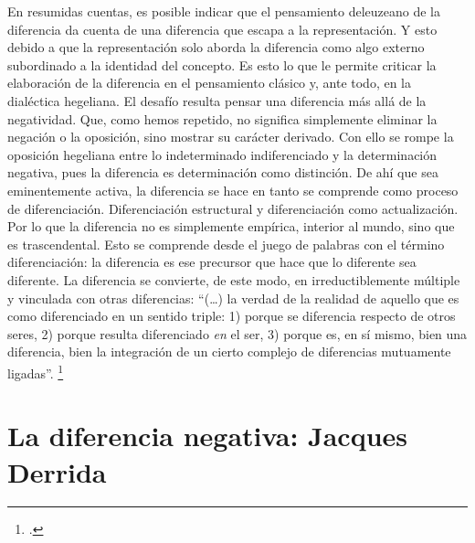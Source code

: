 En resumidas cuentas, es posible indicar que el pensamiento deleuzeano de la diferencia da cuenta de una diferencia que escapa a la representación. Y esto debido a que la representación solo aborda la diferencia como algo externo subordinado a la identidad del concepto. Es esto lo que le permite criticar la elaboración de la diferencia en el pensamiento clásico y, ante todo, en la dialéctica hegeliana. El desafío resulta pensar una diferencia más allá de la negatividad. Que, como hemos repetido, no significa simplemente eliminar la negación o la oposición, sino mostrar su carácter derivado. Con ello se rompe la oposición hegeliana entre lo indeterminado indiferenciado y la determinación negativa, pues la diferencia es determinación como distinción. De ahí que sea eminentemente activa, la diferencia se hace en tanto se comprende como proceso de diferenciación. Diferenciación estructural y diferenciación como actualización. Por lo que la diferencia no es simplemente empírica, interior al mundo, sino que es trascendental. Esto se comprende desde el juego de palabras con el término diferenciación: la diferencia es ese precursor que hace que lo diferente sea diferente. La diferencia se convierte, de este modo, en irreductiblemente múltiple y vinculada con otras diferencias: \enquote{(\ldots) la verdad de la realidad de aquello que es como diferenciado en un sentido triple: 1) porque se diferencia respecto de otros seres, 2) porque resulta diferenciado \emph{en} el ser, 3) porque es, en sí mismo, bien una diferencia, bien la integración de un cierto complejo de diferencias mutuamente ligadas}. \footcite[17]{@6979-GALLEGO2008}

\section{La diferencia negativa: Jacques Derrida}


